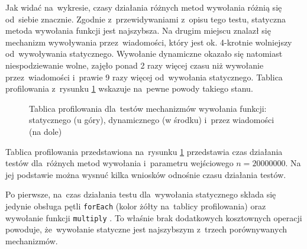 \documentclass[mgr, shortabstract]{iithesis}
\newcommand{\swiftinline}[1]{
    \texttt{#1}
}
\begin{document}
Jak widać na~wykresie, czasy działania różnych metod wywołania różnią się od~siebie znacznie. Zgodnie z~przewidywaniami z~opisu tego testu, statyczna metoda wywołania funkcji jest najszybsza. Na drugim miejscu znalazł się mechanizm wywoływania przez~wiadomości, który jest ok. 4-krotnie wolniejszy od~wywoływania statycznego. Wywołanie dynamiczne okazało się natomiast niespodziewanie wolne, zajęło ponad 2 razy więcej czasu niż wywołanie przez~wiadomości i~prawie 9 razy więcej od~wywołania statycznego. Tablica profilowania z~rysunku \ref{i:dispatch_method} wskazuje na~pewne powody takiego stanu.

\begin{figure}
    \caption{Tablica profilowania dla~testów mechanizmów wywołania funkcji: statycznego (u góry), dynamicznego (w środku) i~przez wiadomości (na dole)}
    \label{i:dispatch_method}
\end{figure}

Tablica profilowania przedstawiona na~rysunku \ref{i:dispatch_method} przedstawia czas działania testów dla~różnych metod wywołania i~parametru wejściowego $n = 20000000$. Na jej podstawie można wysnuć kilka wniosków odnośnie czasu działania testów.

Po pierwsze, na~czas działania testu dla~wywołania statycznego składa się jedynie obsługa pętli \swiftinline{forEach} (kolor żółty na~tablicy profilowania) oraz wywołanie funkcji \swiftinline{multiply}. To właśnie brak dodatkowych kosztownych operacji powoduje, że~wywołanie statyczne jest najszybszym z~trzech porównywanych mechanizmów.
\end{document}
